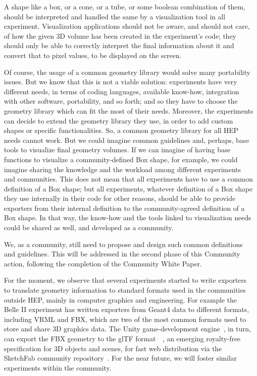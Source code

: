 \documentclass[12pt,a4paper]{article}
\begin{document}
A shape like a box, or a cone, or a tube, or some boolean combination of them, should be interpreted and handled the same by a
visualization tool in all experiment. Visualization applications should not be aware, and should not care, of how  the given 3D
volume has been created in the experiment’s code; they should only be able to correctly interpret the final information about it
and convert that to pixel values, to be displayed on the screen.

Of course, the usage of a common geometry library would solve many portability issues. But we know that this is not a viable
solution: experiments have very different needs, in terms of coding languages, available know-how, integration with other
software, portability, and so forth; and so they have to choose the geometry library which can fit the most of their needs.
Moreover, the experiments can decide to extend the geometry library they use, in order to add custom shapes or specific functionalities.
So, a common geometry library for all HEP needs cannot work.
But we could imagine common guidelines and, perhaps, base tools to visualize final geometry volumes. If we can imagine of
having base functions to visualize a community-defined Box shape, for example, we could imagine sharing the knowledge and the
workload among different experiments and communities. This does not mean that all experiments have to use a common definition
of a Box shape; but all experiments, whatever definition of a Box shape they use internally in their code for other reasons,
should be able to provide exporters from their internal definition to the community-agreed definition of a Box shape.
In that way, the know-how and the tools linked to visualization needs could be shared as well, and developed as a community.

We, as a community, still need to propose and design such common definitions and guidelines. This will
be addressed in the second phase of this Community action, following the completion of the Community White Paper.

For the moment, we observe that several experiments started to write exporters to translate geometry information to
standard formats used in the communities outside HEP, mainly in computer graphics and engineering. For example the Belle II
experiment has written exporters from Geant4 data to different formats, including VRML and FBX, which are two of the most common
formats used to store and share 3D graphics data. The Unity game-development engine~\cite{Unity3D}, in turn, can export the
FBX geometry to the glTF format~\cite{glTF}~\cite{glTF,SketchFabBelleII}, an emerging royalty-free specification for 3D objects and scenes,
for fast web distribution via the SketchFab community repository~\cite{SketchFab}. For the near future, we will foster similar
experiments within the community.
\end{document}
